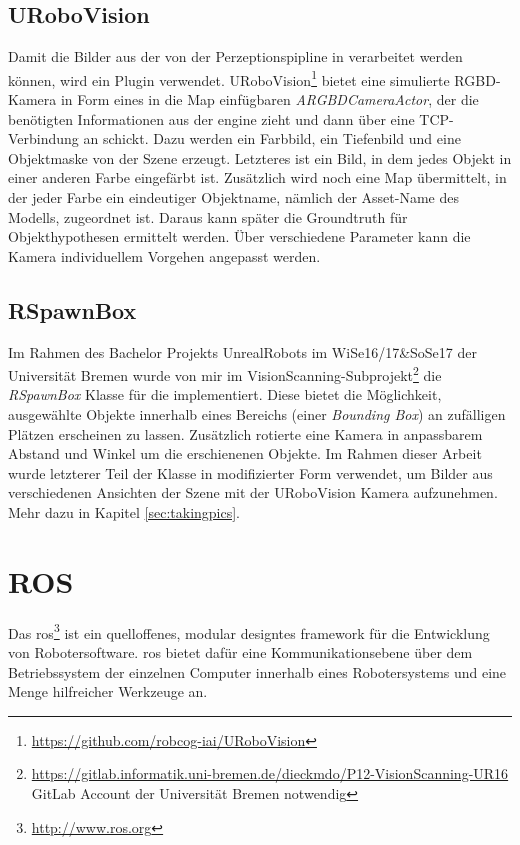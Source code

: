\subsection{URoboVision}
\label{subsec:urobovision}
Damit die Bilder aus der \unreal von der Perzeptionspipline in \robosherlock verarbeitet werden können, wird ein Plugin verwendet. URoboVision\footnote{\url{https://github.com/robcog-iai/URoboVision}} bietet eine simulierte RGBD-Kamera in Form eines in die Map einfügbaren \textit{ARGBDCameraActor}, der die benötigten Informationen aus der \acrshort{engine} zieht und dann über eine TCP-Verbindung an \robosherlock schickt. Dazu werden ein Farbbild, ein Tiefenbild und eine Objektmaske von der Szene erzeugt. Letzteres ist ein Bild, in dem jedes Objekt in einer anderen Farbe eingefärbt ist. Zusätzlich wird noch eine Map übermittelt, in der jeder Farbe ein eindeutiger Objektname, nämlich der Asset-Name des Modells, zugeordnet ist. Daraus kann später die Groundtruth für Objekthypothesen  ermittelt werden. Über verschiedene Parameter kann die Kamera individuellem Vorgehen angepasst werden. \par 

\subsection{RSpawnBox}
\label{sec:rspawnbox}

Im Rahmen des Bachelor Projekts UnrealRobots im WiSe16/17\&SoSe17 der Universität Bremen wurde von mir im VisionScanning-Subprojekt\footnote{\url{https://gitlab.informatik.uni-bremen.de/dieckmdo/P12-VisionScanning-UR16} GitLab Account der Universität Bremen notwendig} die \textit{RSpawnBox} Klasse für die \unreal implementiert. Diese bietet die Möglichkeit, ausgewählte Objekte innerhalb eines Bereichs (einer \textit{Bounding Box}) an zufälligen Plätzen erscheinen zu lassen. Zusätzlich rotierte eine Kamera in anpassbarem Abstand und Winkel um die erschienenen Objekte. Im Rahmen dieser Arbeit wurde letzterer Teil der Klasse in modifizierter Form verwendet, um Bilder aus verschiedenen Ansichten der Szene mit der URoboVision Kamera aufzunehmen. Mehr dazu in Kapitel \ref{sec:takingpics}.         

\section{ROS}
\label{sec:ros}
Das \gls{ros}\footnote{\url{http://www.ros.org}} \cite{ros} ist ein quelloffenes, modular designtes \gls{framework} für die Entwicklung von Robotersoftware. \gls{ros} bietet dafür eine Kommunikationsebene über dem Betriebssystem der einzelnen Computer innerhalb eines Robotersystems und eine Menge hilfreicher Werkzeuge an.\par 

